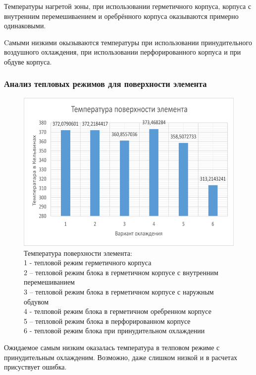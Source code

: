  Температуры нагретой зоны, при использовании
 герметичного корпуса, корпуса с внутренним перемешиваением и
 оребрённого корпуса оказываются примерно одинаковыми.

 Cамыми низкими окызываются температуры при
 использовании принудительного воздушного охлаждения,
 при использовании перфорированного корпуса и
 при обдуве корпуса.
 
\subsubsection{Анализ тепловых режимов для поверхности элемента}
\begin{figure}[h] %
\begin{center}
  \includegraphics[scale = 0.4]{images2/t_el.png}
  \end{center}
\caption{Температура поверхности элемента:\\
  1 - тепловой режим герметичного корпуса\\
  2 – тепловой режим блока в герметичном корпусе с внутренним перемешиванием\\
  3 – тепловой режим блока в герметичном корпусе с наружным обдувом\\
  4 - телповой режим блока в  герметичном оребренном корпусе \\
  5 – тепловой режим блока в перфорированном корпусе \\
  6 - тепловой режим блока при принудительном охлаждении}

\end{figure}

Ожидаемое самым низким оказалась температура в телповом режиме с
принудительным охлажденим. Возможно, даже слишком низкой и в расчетах
присуствует ошибка.\\

